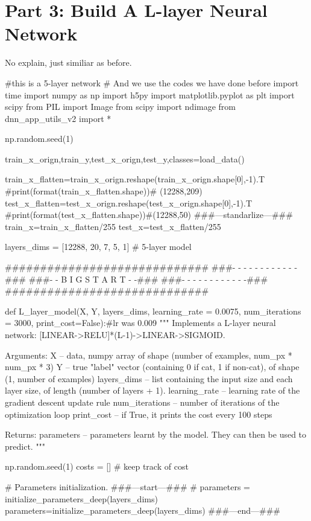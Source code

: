 \documentclass[12pt,a4paper]{article}
\begin{document}
	\section{Part 3: Build A L-layer Neural Network}
	 No explain, just similiar as before.\par
	 \begin{python}
	 	#this is a 5-layer network
	 	# And we use the codes we have done before
	 	import time
	 	import numpy as np
	 	import h5py
	 	import matplotlib.pyplot as plt
	 	import scipy
	 	from PIL import Image
	 	from scipy import ndimage
	 	from dnn_app_utils_v2 import *
	 	
	 	np.random.seed(1)
	 	
	 	train_x_orign,train_y,test_x_orign,test_y,classes=load_data()
	 	
	 	train_x_flatten=train_x_orign.reshape(train_x_orign.shape[0],-1).T 
	 	#print(format(train_x_flatten.shape))# (12288,209)
	 	test_x_flatten=test_x_orign.reshape(test_x_orign.shape[0],-1).T 
	 	#print(format(test_x_flatten.shape))#(12288,50)
	 	###---standarlize---###
	 	train_x=train_x_flatten/255
	 	test_x=test_x_flatten/255
	 	
	 	layers_dims = [12288, 20, 7, 5, 1] # 5-layer model
	 	
	 	#############################
	 	###- - - - - - - - - - - -###
	 	###- - B I G S T A R T - -###
	 	###- - - - - - - - - - - -###
	 	#############################
	 	
	 	def L_layer_model(X, Y, layers_dims, learning_rate = 0.0075, num_iterations = 3000, print_cost=False):#lr was 0.009
	 	"""
	 	Implements a L-layer neural network: [LINEAR->RELU]*(L-1)->LINEAR->SIGMOID.
	 	
	 	Arguments:
	 	X -- data, numpy array of shape (number of examples, num_px * num_px * 3)
	 	Y -- true "label" vector (containing 0 if cat, 1 if non-cat), of shape (1, number of examples)
	 	layers_dims -- list containing the input size and each layer size, of length (number of layers + 1).
	 	learning_rate -- learning rate of the gradient descent update rule
	 	num_iterations -- number of iterations of the optimization loop
	 	print_cost -- if True, it prints the cost every 100 steps
	 	
	 	Returns:
	 	parameters -- parameters learnt by the model. They can then be used to predict.
	 	"""
	 	
	 	np.random.seed(1)
	 	costs = [] # keep track of cost
	 	
	 	# Parameters initialization.
	 	###---start---###
	 	# parameters = initialize_parameters_deep(layers_dims)
	 	parameters=initialize_parameters_deep(layers_dims)
	 	###---end---###
	 	

\end{python}
\end{document}
